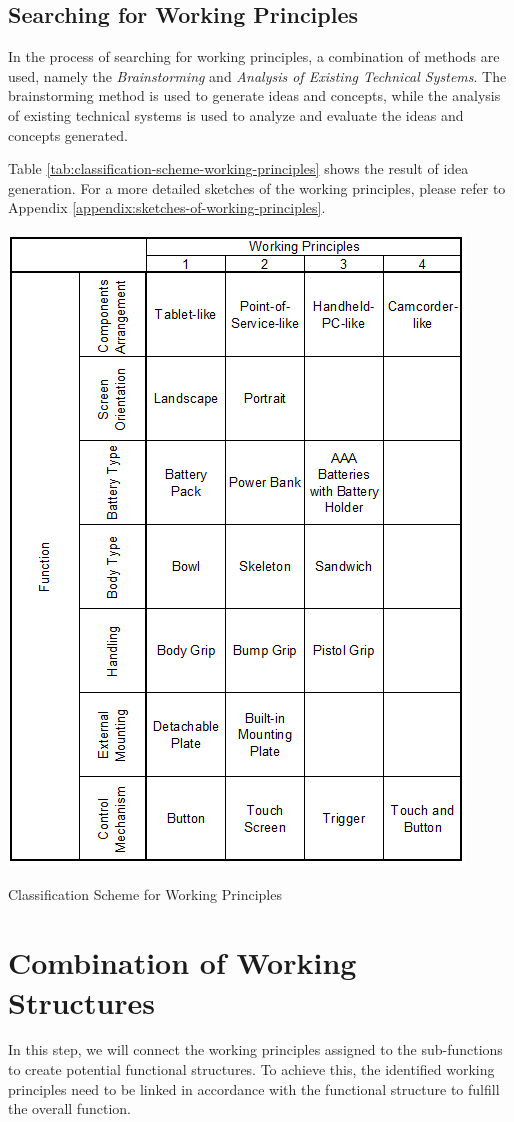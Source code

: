 \subsection{Searching for Working Principles}
In the process of searching for working principles, a combination of methods are used, namely the \textit{Brainstorming} and \textit{Analysis of Existing Technical Systems}. The brainstorming method is used to generate ideas and concepts, while the analysis of existing technical systems is used to analyze and evaluate the ideas and concepts generated.

Table \ref{tab:classification-scheme-working-principles} shows the result of idea generation. For a more detailed sketches of the working principles, please refer to Appendix \ref{appendix:sketches-of-working-principles}.

\begin{table}[H]
    \centering
    \includegraphics[width=0.6\linewidth]{texs/Part1/chapter3/image/stotal.png}
    \caption{Classification Scheme for Working Principles}
    \label{tab:classification-scheme-working-principles}
\end{table}


\section{Combination of Working Structures}

In this step, we will connect the working principles assigned to the sub-functions to create potential functional structures. To achieve this, the identified working principles need to be linked in accordance with the functional structure to fulfill the overall function.

